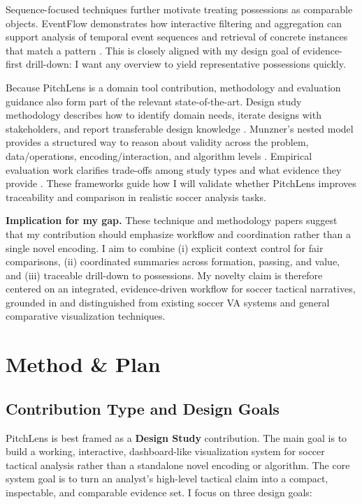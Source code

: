 \documentclass{vgtc}                          %
\begin{document}
Sequence-focused techniques further motivate treating possessions as comparable objects. EventFlow demonstrates
how interactive filtering and aggregation can support analysis of temporal event sequences and retrieval of
concrete instances that match a pattern \cite{Plaisant2013EventFlow}. This is closely aligned with my design
goal of evidence-first drill-down: I want any overview to yield representative possessions quickly.

Because PitchLens is a domain tool contribution, methodology and evaluation guidance also form part of the
relevant state-of-the-art. Design study methodology describes how to identify domain needs, iterate designs with
stakeholders, and report transferable design knowledge \cite{Sedlmair2012DesignStudy,McKenna2014DesignActivity}.
Munzner’s nested model provides a structured way to reason about validity across the problem, data/operations,
encoding/interaction, and algorithm levels \cite{Munzner2009NestedModel}. Empirical evaluation work clarifies
trade-offs among study types and what evidence they provide \cite{Lam2012Evaluation}. These frameworks guide how
I will validate whether PitchLens improves traceability and comparison in realistic soccer analysis tasks.

\textbf{Implication for my gap.}
These technique and methodology papers suggest that my contribution should emphasize workflow and coordination
rather than a single novel encoding. I aim to combine (i) explicit context control for fair comparisons,
(ii) coordinated summaries across formation, passing, and value, and (iii) traceable drill-down to possessions.
My novelty claim is therefore centered on an integrated, evidence-driven workflow for soccer tactical narratives,
grounded in and distinguished from existing soccer VA systems and general comparative visualization techniques.

\section{Method \& Plan}

\subsection{Contribution Type and Design Goals}
PitchLens is best framed as a \textbf{Design Study} contribution. The main goal is to build a working, interactive, dashboard-like visualization system for soccer tactical analysis rather than a standalone novel encoding or algorithm. The core system goal is to turn an analyst's high-level tactical claim into a compact, inspectable, and comparable evidence set. I focus on three design goals:
\end{document}
